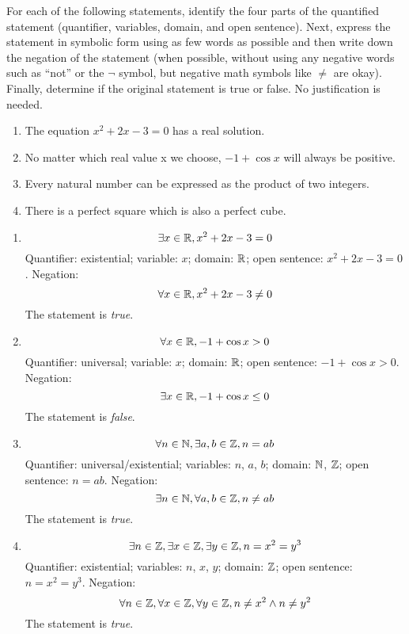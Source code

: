 \begin{recommended}
  For each of the following statements, identify the four parts of the quantified statement
  (quantifier, variables, domain, and open sentence).
  Next, express the statement in symbolic form using as few words as possible and then write down the negation of the statement
  (when possible, without using any negative words such as ``not'' or the $\lnot$ symbol, but negative math symbols like $\neq$ are okay).
  Finally, determine if the original statement is true or false.
  No justification is needed.
  \begin{enumerate}
    \item The equation $x^2+2x-3=0$ has a real solution.
    \item No matter which real value x we choose, $-1 + \cos x$ will always be positive.
    \item Every natural number can be expressed as the product of two integers.
    \item There is a perfect square which is also a perfect cube.
  \end{enumerate}
\end{recommended}
\begin{sol}
  \begin{enumerate}
    \item \[ \exists x\in\mathbb{R}, x^2+2x-3 = 0 \]
          Quantifier: existential;
          variable: $x$;
          domain: $\mathbb{R}$;
          open sentence: $x^2+2x-3=0$.
          Negation:
          \[ \forall x\in\mathbb{R}, x^2+2x-3 \neq 0 \]
          The statement is \emph{true}.
    \item \[ \forall x\in\mathbb{R}, -1 + \cos x > 0 \]
          Quantifier: universal;
          variable: $x$;
          domain: $\mathbb{R}$;
          open sentence: $-1 + \cos x > 0$.
          Negation:
          \[ \exists x\in\mathbb{R}, -1 + \cos x \leq 0 \]
          The statement is \emph{false}.
    \item \[ \forall n\in\mathbb{N}, \exists a,b\in\mathbb{Z}, n = ab \]
          Quantifier: universal/existential;
          variables: $n$, $a$, $b$;
          domain: $\mathbb{N}$, $\mathbb{Z}$;
          open sentence: $n = ab$.
          Negation:
          \[ \exists n\in\mathbb{N}, \forall a,b\in\mathbb{Z}, n \neq ab \]
          The statement is \emph{true}.
    \item \[ \exists n\in\mathbb{Z}, \exists x\in\mathbb{Z}, \exists y\in\mathbb{Z}, n=x^2=y^3 \]
          Quantifier: existential; variables: $n$, $x$, $y$; domain: $\mathbb{Z}$; open sentence: $n=x^2=y^3$.
          Negation:
          \[ \forall n\in\mathbb{Z}, \forall x\in\mathbb{Z}, \forall y\in\mathbb{Z}, n \neq x^2 \land n \neq y^2 \]
          The statement is \emph{true}. \qedhere
  \end{enumerate}
\end{sol}

